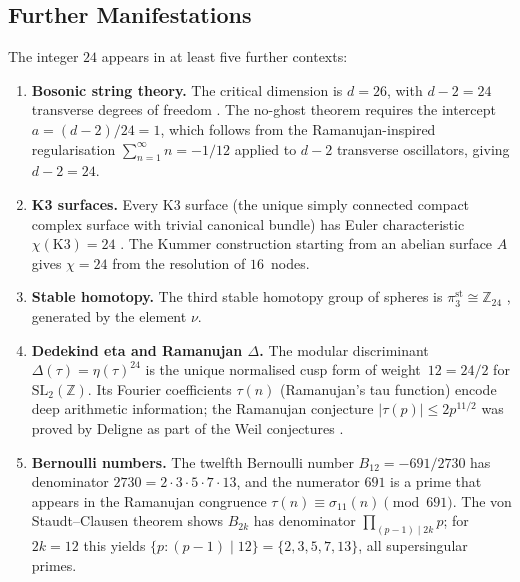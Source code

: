 \documentclass[11pt,a4paper]{article}
\theoremstyle{plain}
\theoremstyle{remark}
\newcommand{\Z}{\mathbb{Z}}
\newcommand{\abs}[1]{\lvert #1 \rvert}
\newcommand{\SL}{\mathrm{SL}}
\begin{document}
\subsection{Further Manifestations}
\label{sec:path-further}

The integer $24$ appears in at least five further contexts:

\begin{enumerate}[label=(\roman*),itemsep=3pt]
\item \textbf{Bosonic string theory.}
  The critical dimension is $d=26$, with $d-2=24$ transverse
  degrees of freedom \cite{green-schwarz-witten1987}.
  The no-ghost theorem requires the intercept $a=(d-2)/24=1$,
  which follows from the Ramanujan-inspired regularisation
  $\sum_{n=1}^\infty n = -1/12$ applied to $d-2$ transverse
  oscillators, giving $d-2=24$.

\item \textbf{K3 surfaces.}
  Every K3 surface (the unique simply connected compact complex
  surface with trivial canonical bundle) has Euler characteristic
  $\chi(\mathrm{K3})=24$ \cite{huybrechts2016}.  The Kummer
  construction starting from an abelian surface $A$ gives
  $\chi=24$ from the resolution of $16$~nodes.

\item \textbf{Stable homotopy.}
  The third stable homotopy group of spheres is
  $\pi_3^{\mathrm{st}}\cong\Z_{24}$ \cite{ravenel1986},
  generated by the element $\nu$.

\item \textbf{Dedekind eta and Ramanujan $\Delta$.}
  The modular discriminant $\Delta(\tau) = \eta(\tau)^{24}$ is the
  unique normalised cusp form of weight~$12 = 24/2$ for $\SL_2(\Z)$.
  Its Fourier coefficients $\tau(n)$ (Ramanujan's tau function) encode
  deep arithmetic information; the Ramanujan conjecture
  $\abs{\tau(p)}\leq 2p^{11/2}$ was proved by Deligne as part of
  the Weil conjectures \cite{ramanujan1916}.

\item \textbf{Bernoulli numbers.}
  The twelfth Bernoulli number $B_{12}=-691/2730$ has denominator
  $2730 = 2\cdot 3\cdot 5\cdot 7\cdot 13$, and the numerator $691$
  is a prime that appears in the Ramanujan congruence
  $\tau(n)\equiv\sigma_{11}(n)\pmod{691}$.
  The von Staudt--Clausen theorem shows $B_{2k}$ has denominator
  $\prod_{(p-1)\mid 2k}p$; for $2k=12$ this yields
  $\{p: (p-1)\mid 12\} = \{2,3,5,7,13\}$, all supersingular primes.
\end{enumerate}
\end{document}
